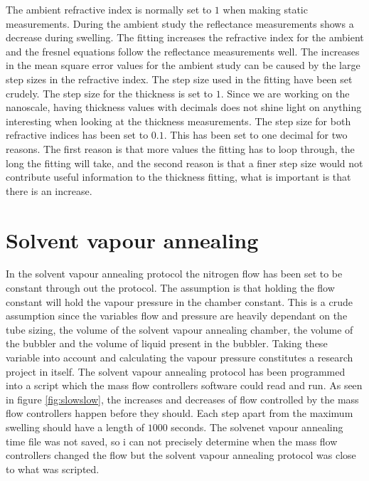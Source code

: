 \documentclass[MasterThesisMain.tex]{subfiles}
\begin{document}
The ambient refractive index is normally set to $1$ when making static measurements. During the ambient study the reflectance measurements shows a decrease during swelling. The fitting increases the refractive index for the ambient and the fresnel equations follow the reflectance measurements well. The increases in the mean square error values for the ambient study can be caused by the large step sizes in the refractive index. The step size used in the  fitting have been set crudely. The step size for the thickness is set to $1$. Since we are working on the nanoscale, having thickness values with decimals does not shine light on anything interesting when looking at the thickness measurements. The step size for both refractive indices has been set to $0.1$. This has been set to one decimal for two reasons. The first reason is that more values the fitting has to loop through, the long the fitting will take, and the second reason is that a finer step size would not contribute useful information to the thickness fitting, what is important is that there is an increase.        

\section{Solvent vapour annealing}
In the solvent vapour annealing protocol the nitrogen flow has been set to be constant through out the protocol. The assumption is that holding the flow constant will hold the vapour pressure in the chamber constant. This is a crude assumption since the variables flow and pressure are heavily dependant on the tube sizing, the volume of the solvent vapour annealing chamber, the volume of the bubbler and the volume of liquid present in the bubbler. Taking these variable into account and calculating the vapour pressure constitutes a research project in itself. The solvent vapour annealing protocol has been programmed into a script which the mass flow controllers software could read and run. As seen in figure \ref{fig:slowslow}, the increases and decreases of flow controlled by the mass flow controllers happen before they should. Each step apart from the maximum swelling should have a length of $1000$ seconds. The solvenet vapour annealing time file was not saved, so i can not precisely determine when the mass flow controllers changed the flow but the solvent vapour annealing protocol was close to what was scripted.   
\end{document}
